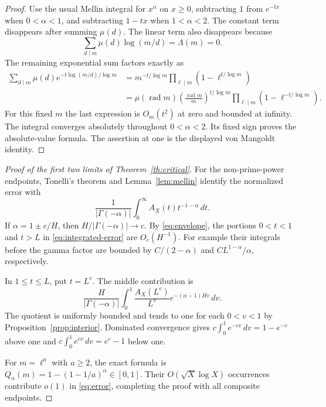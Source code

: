 \documentclass[11pt]{article}
\theoremstyle{remark}
\newcommand{\rad}{\operatorname{rad}}
\begin{document}
\begin{proof}
Use the usual Mellin integral for $x^\alpha$ on $x\ge0$, subtracting
$1$ from $e^{-tx}$ when $0<\alpha<1$, and subtracting $1-tx$ when
$1<\alpha<2$. The constant term disappears after summing $\mu(d)$.
The linear term also disappears because
\[
 \sum_{d\mid m}\mu(d)\log(m/d)=\Lambda(m)=0.
\]
The remaining exponential sum factors exactly as
\begin{align*}
 \sum_{d\mid m}\mu(d)e^{-t\log(m/d)/\log m}
 &=m^{-t/\log m}\prod_{\ell\mid m}(1-\ell^{t/\log m})\\
 &=\mu(\rad m)\left(\frac{\rad m}{m}\right)^{t/\log m}
                   \prod_{\ell\mid m}(1-\ell^{-t/\log m}).
\end{align*}
For this fixed $m$ the last expression is $O_m(t^2)$ at zero and
bounded at infinity. The integral converges absolutely throughout
$0<\alpha<2$. Its fixed sign proves the absolute-value formula.
The assertion at one is the displayed von Mangoldt identity.
\end{proof}

\begin{proof}[Proof of the first two limits of Theorem~\ref{th:critical}]
For the non-prime-power endpoints, Tonelli's theorem and
Lemma~\ref{lem:mellin} identify the normalized error with
\begin{equation}\label{eq:integrated-error}
 \frac1{|\Gamma(-\alpha)|}
         \int_0^\infty A_X(t)t^{-1-\alpha}\,dt.
\end{equation}
If $\alpha=1\pm c/H$, then
$H/|\Gamma(-\alpha)|\to c$.
By \eqref{eq:envelope}, the portions $0<t<1$ and $t>L$ in
\eqref{eq:integrated-error} are $O_c(H^{-1})$.
For example their integrals before the gamma factor are bounded by
$C/(2-\alpha)$ and $CL^{1-\alpha}/\alpha$, respectively.

In $1\le t\le L$, put $t=L^v$. The middle contribution is
\[
 \frac{H}{|\Gamma(-\alpha)|}
       \int_0^1\frac{A_X(L^v)}{L^v}
                   e^{-(\alpha-1)Hv}\,dv.
\]
The quotient is uniformly bounded and tends to one for each
$0<v<1$ by Proposition~\ref{prop:interior}. Dominated convergence
gives $c\int_0^1e^{-cv}\,dv=1-e^{-c}$ above one and
$c\int_0^1e^{cv}\,dv=e^c-1$ below one.

For $m=\ell^a$ with $a\ge2$, the exact formula is
$Q_\alpha(m)=1-(1-1/a)^\alpha\in[0,1]$.
Their $O(\sqrt X\log X)$ occurrences contribute $o(1)$ in
\eqref{eq:error}, completing the proof with all composite endpoints.
\end{proof}
\end{document}
